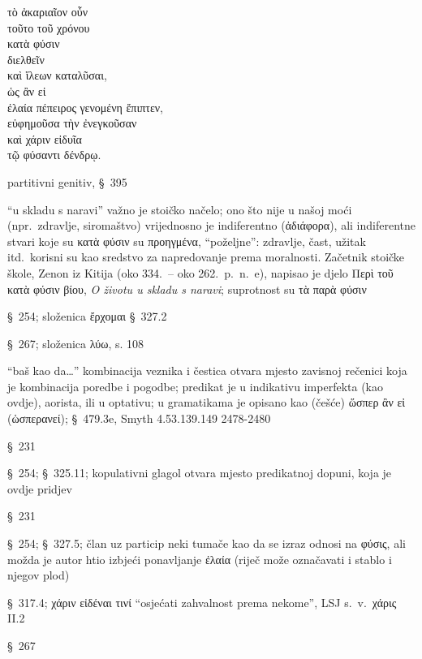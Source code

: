 {\large
\begin{greek}
\noindent τὸ ἀκαριαῖον οὖν \\
τοῦτο τοῦ χρόνου \\
\tabto{2em} κατὰ φύσιν \\
διελθεῖν \\
καὶ ἵλεων καταλῦσαι, \\
ὡς ἂν εἰ \\
\tabto{2em} ἐλαία πέπειρος γενομένη ἔπιπτεν, \\
\tabto{4em} εὐφημοῦσα τὴν ἐνεγκοῦσαν \\
\tabto{4em} καὶ χάριν εἰδυῖα \\
\tabto{6em} τῷ φύσαντι δένδρῳ.\\

\end{greek}
}

\begin{description}[noitemsep]
\item[τοῦτο τοῦ χρόνου] partitivni genitiv, §~395
\item[κατὰ φύσιν] ``u skladu s naravi'' važno je stoičko načelo; ono što nije u našoj moći (npr.\ zdravlje, siromaštvo) vrijednosno je indiferentno (ἀδιάφορα), ali indiferentne stvari koje su κατὰ φύσιν su προηγμένα, ``poželjne'': zdravlje, čast, užitak itd.\ korisni su kao sredstvo za napredovanje prema moralnosti. Začetnik stoičke škole, Zenon iz Kitija (oko 334.\ – oko 262.\ p.~n.~e), napisao je djelo Περὶ τοῦ κατὰ φύσιν βίου, \textit{O životu u skladu s naravi}; suprotnost su τὰ παρὰ φύσιν
\item[διελθεῖν] §~254; složenica ἔρχομαι §~327.2
\item[καταλῦσαι] §~267; složenica λύω, s. 108
\item[ὡς ἂν εἰ] ``baš kao da\dots'' kombinacija veznika i čestica otvara mjesto zavisnoj rečenici koja je kombinacija poredbe i pogodbe; predikat je u indikativu imperfekta (kao ovdje), aorista, ili u optativu; u gramatikama je opisano kao (češće) ὥσπερ ἂν εἰ (ὡσπερανεί); §~479.3e, Smyth 4.53.139.149 2478-2480
\item[ἔπιπτεν] §~231
\item[πέπειρος γενομένη] §~254; §~325.11; kopulativni glagol otvara mjesto predikatnoj dopuni, koja je ovdje pridjev
\item[εὐφημοῦσα] §~231
\item[τὴν ἐνεγκοῦσαν] §~254; §~327.5; član uz particip neki tumače kao da se izraz odnosi na φύσις, ali možda je autor htio izbjeći ponavljanje ἐλαία (riječ može označavati i stablo i njegov plod)
\item[εἰδυῖα] §~317.4; χάριν εἰδέναι τινί ``osjećati zahvalnost prema nekome'', LSJ s.~v.\ χάρις II.2
\item[φύσαντι] §~267
\end{description}



